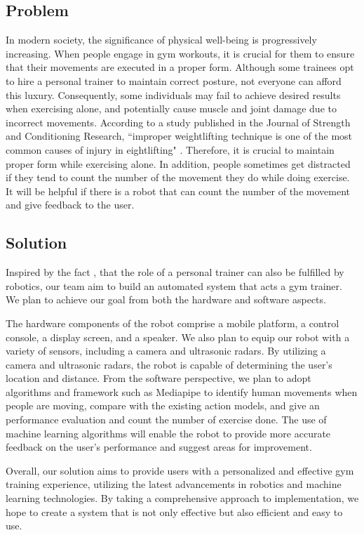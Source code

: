 \subsection{Problem}
In modern society, the significance of physical well-being is progressively increasing. When people engage in gym workouts, it is crucial for them to ensure that their movements are executed in a proper form. Although some trainees opt to hire a personal trainer to maintain correct posture, not everyone can afford this luxury. Consequently, some individuals may fail to achieve desired results when exercising alone, and potentially cause muscle and joint damage due to incorrect movements. According to a study published in the Journal of Strength and Conditioning Research, ``improper weightlifting technique is one of the most common causes of injury in eightlifting" \cite{keogh2006injury}. Therefore, it is crucial to maintain proper form while exercising alone.
In addition, people sometimes get distracted if they tend to count the number of the movement they do while doing exercise. It will be helpful if there is a robot that can count the number of the movement and give feedback to the user.

\subsection{Solution}
Inspired by the fact \cite{li2019real}, \cite{liu2021robotics} that the role of a personal trainer can also be fulfilled by robotics, our team aim to build an automated system that acts a gym trainer. We plan to achieve our goal from both the hardware and software aspects.

The hardware components of the robot comprise a mobile platform, a control console, a display screen, and a speaker. We also plan to equip our robot with a variety of sensors, including a camera and ultrasonic radars. By utilizing a camera and ultrasonic radars, the robot is capable of determining the user’s location and distance. From the software perspective, we plan to adopt algorithms and framework such as Mediapipe to identify human movements when people are moving, compare with the existing action models, and give an performance evaluation and count the number of exercise done. The use of machine learning algorithms will enable the robot to provide more accurate feedback on the user’s performance and suggest areas for improvement. 

Overall, our solution aims to provide users with a personalized and effective gym training experience, utilizing the latest advancements in robotics and machine learning technologies. By taking a comprehensive approach to implementation, we hope to create a system that is not only effective but also efficient and easy to use.


